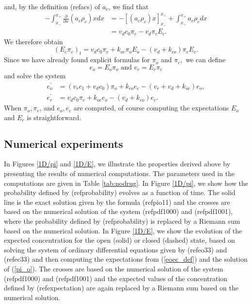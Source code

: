 and, by the definition (ref{acs}) of $a_{c}$, we find that
\begin{align}
-\int_{x_{-}}^{x_{+}}\frac{\partial}{\partial x}\left(  a_{c}\rho_{c}\right)
xdx &  =-\left[  \left(  a_{c}\rho_{c}\right)  x\right]  _{x_{-}}^{x_{+}}
+\int_{x_{-}}^{x_{+}}a_{c}\rho_{c}dx\\
&  =v_{d}c_{0}\pi_{c}-v_{d}\pi_{c}E_{c}.
\end{align}
We therefore obtain
\begin{equation}
\left(  E_{c}\pi_{c}\right)  _{t}=v_{d}c_{0}\pi_{c}+k_{oc}\pi_{o}E_{o}-\left(
v_{d}+k_{co}\right)  \pi_{c}E_{c}.
\end{equation}
Since we have already found explicit formulas for $\pi_{o}$ and $\pi_{c},$ we
can define
\begin{equation}
e_{o}=E_{o}\pi_{o}\text{ and }e_{c}=E_{c}\pi_{c} \label{eoec_def}
\end{equation}
and solve the system
\begin{align}
e_{o}^{\prime}  & =\left(  v_{r}c_{1}+v_{d}c_{0}\right)  \pi_{o}+k_{co}
e_{c}-\left(  v_{r}+v_{d}+k_{oc}\right)  e_{o}, \label{eo33}\\
e_{c}^{\prime}  & =v_{d}c_{0}\pi_{c}+k_{oc}e_{o}-\left(  v_{d}+k_{co}\right)
e_{c}. \label{ec33}
\end{align}
When $\pi_{o},\pi_{c}$, and $e_{o},e_{c}$ are computed, of course computing 
the expectations $E_{o}$ and $E_{c}$ is straightforward.


\subsection{Numerical experiments} 

In Figures \ref{1D/pi} and \ref{1D/E}, we illustrate the properties derived above by presenting the
results of numerical computations. The parameters used in the computations are
given in Table \ref{tab:nodrug}. In Figure  \ref{1D/pi}, we show how the
probability defined by (ref{probability}) evolves as a
function of time. The solid line is the exact solution given by the formula
(ref{pio11}) and the crosses are based on the numerical
solution of the system (ref{pdf1000}) and (ref{pdf1001}), where
the probability defined by (ref{probability}) is replaced by
a Riemann sum based on the numerical solution. In Figure \ref{1D/E}, we show the
evolution of the expected concentration for the open (solid) or closed
(dashed) state, based on solving the system of ordinary differential
equations given by (ref{eo33}) and (ref{ec33}) and then computing
the expectations from (\ref{eoec_def}) and the solution of  (\ref{pi_o}).  
The crosses 
are based on the numerical solution of the system  
(ref{pdf1000}) and (ref{pdf1001}) and the expected values of the concentration defined by
(ref{expectation}) are again replaced by a Riemann sum based
on the numerical solution. 

